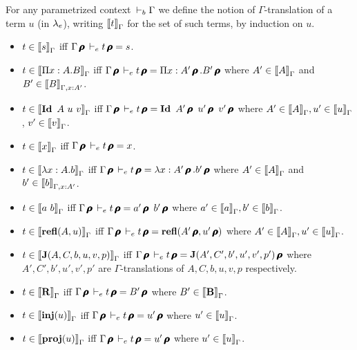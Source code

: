 \documentclass[a4paper,english]{lipics-utf8x}
\begin{document}
  \begin{definition}
    For any parametrized context $\derb \Gamma$ we define the notion of
    $\Gamma$-translation of a term $u$ (in $\Se$), writing $\tr{t}{\Gamma}$ for
    the set of such terms, by induction on $u$.
    \begin{itemize}
      \item $t \in \tr{s}{\Gamma}$ iff
            $\Gamma\prfl \dere t\prfl = s$.
      \item $t \in \tr{\Pi x:A.B}{\Gamma}$ iff
            $\Gamma\prfl \dere t\prfl =
            \Pi x:A'\prfl.B'\prfl$ where
            $A' \in \tr{A}{\Gamma}$ and $B' \in \tr{B}{\Gamma, x:A'}$.
      \item $t \in \tr{\Id A\ u\ v}{\Gamma}$ iff
            $\Gamma\prfl \dere t\prfl = \Id A'\prfl\ u'\prfl\ %
            v'\prfl$ where $A' \in \tr{A}{\Gamma}, u' \in \tr{u}{\Gamma}$,
            $v' \in \tr{v}{\Gamma}$.
      \item $t \in \tr{x}{\Gamma}$ iff
            $\Gamma\prfl \dere t\prfl = x$.
      \item $t \in \tr{\lambda x:A.b}{\Gamma}$ iff
            $\Gamma\prfl \dere t\prfl = \lambda x:A'\prfl.b'\prfl$
            where $A' \in \tr{A}{\Gamma}$ and $b' \in \tr{b}{\Gamma, x:A'}$.
      \item $t \in \tr{a\ b}{\Gamma}$ iff
            $\Gamma\prfl \dere t\prfl = a'\prfl\ b'\prfl$ where
            $a' \in \tr{a}{\Gamma}, b' \in \tr{b}{\Gamma}$.
      \item $t \in \tr{\refl(A,u)}{\Gamma}$ iff
            $\Gamma\prfl \dere t\prfl = \refl(A'\prfl,u'\prfl)$ where
            $A' \in \tr{A}{\Gamma}, u' \in \tr{u}{\Gamma}$.
      \item \sloppy
            $t \in \tr{\J(A,C,b,u,v,p)}{\Gamma}$ iff
            $\Gamma\prfl \dere t\prfl = \J(A',C',b',u',v',p')\prfl$
            where $A',C',b',u',v',p'$ are $\Gamma$-translations of
            $A,C,b,u,v,p$ respectively.
      \item $t \in \tr{\mR}{\Gamma}$ iff
            $\Gamma\prfl \dere t\prfl = B'\prfl$ where
            $B' \in \tr{\mB}{\Gamma}$.
      \item $t \in \tr{\inj(u)}{\Gamma}$ iff
            $\Gamma\prfl \dere t\prfl = u'\prfl$ where
            $u' \in \tr{u}{\Gamma}$.
      \item $t \in \tr{\proj(u)}{\Gamma}$ iff
            $\Gamma\prfl \dere t\prfl = u'\prfl$ where
            $u' \in \tr{u}{\Gamma}$.
    \end{itemize}
  \end{definition}
\end{document}
